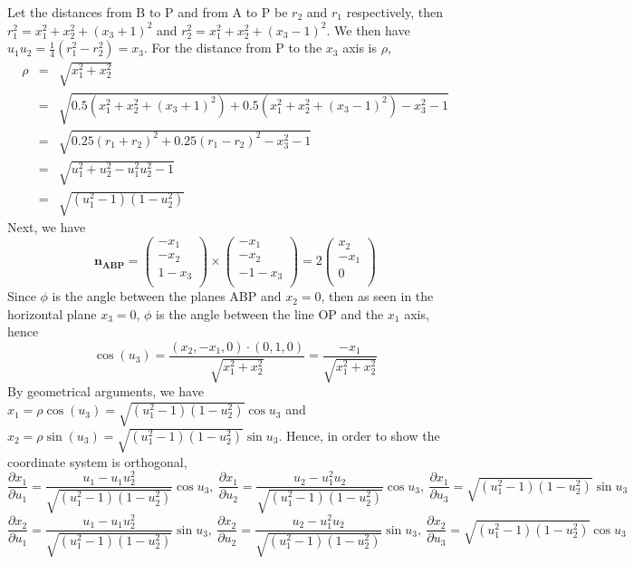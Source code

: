 \documentclass[a4paper]{article}
\begin{document}
\begin{ans}
Let the distances from B to P and from A to P be $r_2$ and $r_1$ respectively, then $r_1^2=x_1^2+x_2^2+(x_3+1)^2$ and $r_2^2=x_1^2+x_2^2+(x_3-1)^2$. We then have $u_1u_2=\frac{1}{4}(r_1^2-r_2^2)=x_3$. For the distance from P to the $x_3$ axis is $\rho$,
\begin{eqnarray}
\rho&=&\sqrt{x_1^2+x_2^2}\nonumber\\&=&\sqrt{0.5(x_1^2+x_2^2+(x_3+1)^2)+0.5(x_1^2+x_2^2+(x_3-1)^2)-x_3^2-1}\nonumber\\&=&\sqrt{0.25(r_1+r_2)^2+0.25(r_1-r_2)^2-x_3^2-1}\nonumber\\&=&\sqrt{u_1^2+u_2^2-u_1^2u_2^2-1}\nonumber\\&=&\sqrt{(u_1^2-1)(1-u_2^2)}\nonumber
\end{eqnarray}
Next, we have
$$\mathbf{n_{ABP}}=\begin{pmatrix}-x_1\\-x_2\\1-x_3\\\end{pmatrix}\times\begin{pmatrix}-x_1\\-x_2\\-1-x_3\\\end{pmatrix}=2\begin{pmatrix}x_2\\-x_1\\0\\\end{pmatrix}$$
Since $\phi$ is the angle between the planes ABP and $x_2=0$, then as seen in the horizontal plane $x_3=0$, $\phi$ is the angle between the line OP and the $x_1$ axis, hence $$\cos(u_3)=\frac{(x_2,-x_1,0)\cdot(0,1,0)}{\sqrt{x_1^2+x_2^2}}=\frac{-x_1}{\sqrt{x_1^2+x_2^2}}$$
By geometrical arguments, we have $x_1=\rho\cos(u_3)=\sqrt{(u_1^2-1)(1-u_2^2)}\cos u_3$ and $x_2=\rho\sin(u_3)=\sqrt{(u_1^2-1)(1-u_2^2)}\sin u_3$. Hence, in order to show the coordinate system is orthogonal,
$$\frac{\partial x_1}{\partial u_1}=\frac{u_1-u_1u_2^2}{\sqrt{(u_1^2-1)(1-u_2^2)}}\cos u_3,~\frac{\partial x_1}{\partial u_2}=\frac{u_2-u_1^2u_2}{\sqrt{(u_1^2-1)(1-u_2^2)}}\cos u_3,~\frac{\partial x_1}{\partial u_3}=\sqrt{(u_1^2-1)(1-u_2^2)}\sin u_3$$
$$\frac{\partial x_2}{\partial u_1}=\frac{u_1-u_1u_2^2}{\sqrt{(u_1^2-1)(1-u_2^2)}}\sin u_3,~\frac{\partial x_2}{\partial u_2}=\frac{u_2-u_1^2u_2}{\sqrt{(u_1^2-1)(1-u_2^2)}}\sin u_3,~\frac{\partial x_2}{\partial u_3}=\sqrt{(u_1^2-1)(1-u_2^2)}\cos u_3$$

\end{ans}
\end{document}
